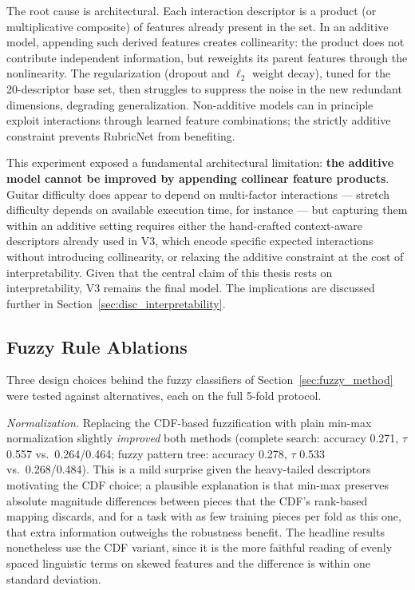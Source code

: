 The root cause is architectural. Each interaction descriptor is a product (or multiplicative composite) of features already present in the set. In an additive model, appending such derived features creates collinearity: the product does not contribute independent information, but reweights its parent features through the nonlinearity. The regularization (dropout and $\ell_2$ weight decay), tuned for the 20-descriptor base set, then struggles to suppress the noise in the new redundant dimensions, degrading generalization. Non-additive models can in principle exploit interactions through learned feature combinations; the strictly additive constraint prevents RubricNet from benefiting.

This experiment exposed a fundamental architectural limitation: \textbf{the additive model cannot be improved by appending collinear feature products}. Guitar difficulty does appear to depend on multi-factor interactions --- stretch difficulty depends on available execution time, for instance --- but capturing them within an additive setting requires either the hand-crafted context-aware descriptors already used in V3, which encode specific expected interactions without introducing collinearity, or relaxing the additive constraint at the cost of interpretability. Given that the central claim of this thesis rests on interpretability, V3 remains the final model. The implications are discussed further in Section~\ref{sec:disc_interpretability}.

\subsection{Fuzzy Rule Ablations}
\label{sec:fuzzy_ablation}
Three design choices behind the fuzzy classifiers of Section~\ref{sec:fuzzy_method} were tested against alternatives, each on the full 5-fold protocol.

\emph{Normalization.} Replacing the CDF-based fuzzification with plain min-max normalization slightly \emph{improved} both methods (complete search: accuracy 0.271, $\tau$ 0.557 vs.\ 0.264/0.464; fuzzy pattern tree: accuracy 0.278, $\tau$ 0.533 vs.\ 0.268/0.484). This is a mild surprise given the heavy-tailed descriptors motivating the CDF choice; a plausible explanation is that min-max preserves absolute magnitude differences between pieces that the CDF's rank-based mapping discards, and for a task with as few training pieces per fold as this one, that extra information outweighs the robustness benefit. The headline results nonetheless use the CDF variant, since it is the more faithful reading of evenly spaced linguistic terms on skewed features and the difference is within one standard deviation.

